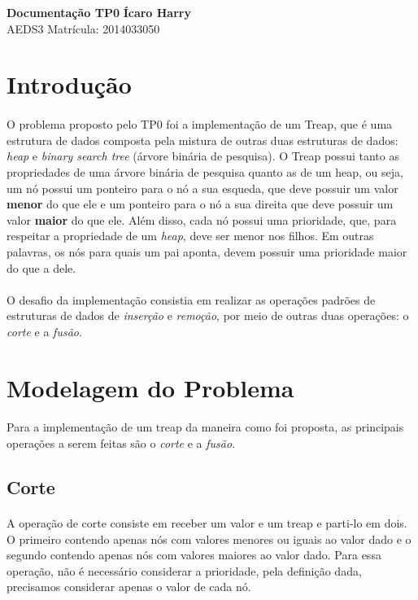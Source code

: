 \documentclass[a4paper, 12pt]{article}
\begin{document}
\noindent
\large\textbf{Documentação TP0} \hfill \textbf{Ícaro Harry} \\
\normalsize AEDS3 \hfill  Matrícula: 2014033050\\


\section{Introdução}
\paragraph{}
O problema proposto pelo TP0 foi a implementação de um Treap, que é uma estrutura de dados composta pela mistura de outras duas estruturas de dados: \textit{heap} e \textit{binary search tree} (árvore binária de pesquisa). O Treap possui tanto as propriedades de uma árvore binária de pesquisa quanto as de um heap, ou seja, um nó possui um ponteiro para o nó a sua esqueda, que deve possuir um valor \textbf{menor} do que ele e um ponteiro para o nó a sua direita que deve possuir um valor \textbf{maior} do que ele. 
Além disso, cada nó possui uma prioridade, que, para respeitar a propriedade de um \textit{heap}, deve ser menor nos filhos. Em outras palavras, os nós para quais um pai aponta, devem possuir uma prioridade maior do que a dele.
\paragraph{}
O desafio da implementação consistia em realizar as operações padrões de estruturas de dados de \textit{inserção} e \textit{remoção}, por meio de outras duas operações: o \textit{corte} e a \textit{fusão}.

\section{Modelagem do Problema}
\paragraph{}
Para a implementação de um treap da maneira como foi proposta, as principais operações a serem feitas são o \textit{corte} e a \textit{fusão}.

\subsection{Corte}
\paragraph{}
A operação de corte consiste em receber um valor e um treap e parti-lo em dois. O primeiro contendo apenas nós com valores menores ou iguais ao valor dado e o segundo contendo apenas nós com valores maiores ao valor dado. Para essa operação, não é necessário considerar a prioridade, pela definição dada, precisamos considerar apenas o valor de cada nó.
\end{document}
